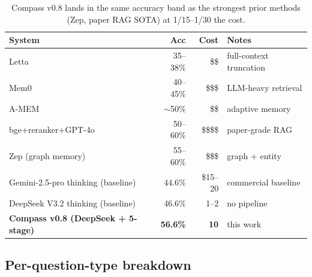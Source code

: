 \begin{table}[h]
\centering
\small
\begin{tabular}{lrrl}
\toprule
\textbf{System} & \textbf{Acc} & \textbf{Cost} & \textbf{Notes} \\
\midrule
Letta \citep{letta2024} & 35--38\% & \$\$ & full-context truncation \\
Mem0 \citep{mem0_2024} & 40--45\% & \$\$\$ & LLM-heavy retrieval \\
A-MEM \citep{amem_2024} & \(\sim\)50\% & \$\$ & adaptive memory \\
\citet{wu2024longmemeval} bge+reranker+GPT-4o & 50--60\% & \$\$\$\$ & paper-grade RAG \\
Zep (graph memory) \citep{zep2025} & 55--60\% & \$\$\$ & graph + entity \\
\midrule
Gemini-2.5-pro thinking (baseline) & 44.6\% & \$15--20 & commercial baseline \\
DeepSeek V3.2 thinking (baseline) & 46.6\% & \cny{}1--2 & no pipeline \\
\textbf{Compass v0.8 (DeepSeek + 5-stage)} & \textbf{56.6\%} & \textbf{\cny{}10} & this work \\
\bottomrule
\end{tabular}
\caption{Compass v0.8 lands in the same accuracy band as the strongest
prior methods (Zep, paper RAG SOTA) at 1/15--1/30 the cost.}
\label{tab:headline}
\end{table}

\subsection{Per-question-type breakdown}

